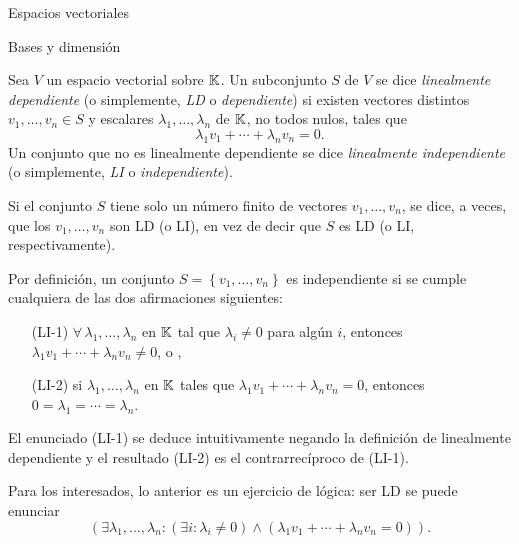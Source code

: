 \begin{chapter}{Espacios vectoriales}
\begin{section}{Bases y dimensi\'on}\label{seccion-bases-y-dimension}
    \begin{definicion}
        Sea $V$ un espacio vectorial sobre $\mathbb K$. Un subconjunto $S$ de $V$ se dice \textit{linealmente dependiente} (o simplemente, \textit{LD} o \textit{dependiente}) si existen vectores distintos $v_1,\ldots,v_n \in S$  y escalares $\lambda_1,\ldots,\lambda_n$ de $\mathbb K$, no todos nulos, tales que 	
        \begin{equation*}
            \lambda_1v_1+\cdots+\lambda_nv_n=0.
        \end{equation*}
        Un conjunto que no es linealmente dependiente se dice \textit{linealmente independiente} (o simplemente, \textit{LI} o \textit{independiente}).
        
        Si el conjunto $S$ tiene solo un número finito de vectores $v_1,\ldots,v_n$, se dice,
        a veces, que los $v_1,\ldots,v_n$ son LD (o LI), en vez de decir
        que $S$ es LD (o LI, respectivamente).
        
    \end{definicion}

\begin{observacion*} Por definición, un conjunto $S = \left\{v_1,\ldots,v_n \right\}$ es independiente si se cumple cualquiera de las dos afirmaciones siguientes:
	
	\begin{itemize}
		\item[(LI-1)]\label{LT-1} $\forall\,\lambda_1,\ldots,\lambda_n$ en $\mathbb K$ tal que $\lambda_i \ne 0$ para algún $i$,  entonces  $\lambda_1v_1+\cdots+\lambda_nv_n\not=0$, o , 
		\item[(LI-2)]\label{LT-2} si $\lambda_1,\ldots,\lambda_n$ en $\mathbb K$ tales que $\lambda_1v_1+\cdots+\lambda_nv_n=0$,  entonces $0=\lambda_1=\cdots=\lambda_n$.
	\end{itemize}


    El enunciado (LI-1) se deduce intuitivamente negando  la definición de linealmente dependiente y el resultado (LI-2) es el contrarrecíproco  de (LI-1).
    
    
Para los interesados, lo anterior es un ejercicio de lógica: ser LD se puede enunciar 
\begin{equation*}\label{eq-ld}
    (\exists \lambda_1,\ldots,\lambda_n: (\exists i: \lambda_i \ne 0) \wedge (\lambda_1v_1+\cdots+\lambda_nv_n=0 )).
\tag{LD}
\end{equation*}


\end{observacion*}
\end{section}
\end{chapter}

